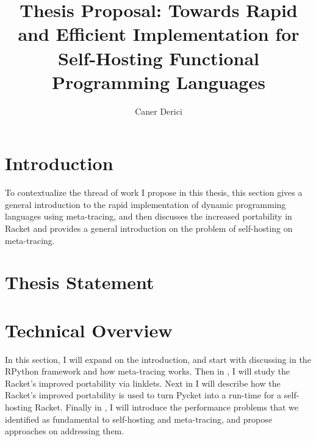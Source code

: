 \documentclass[9pt]{extarticle}
\title{Thesis Proposal: Towards Rapid and Efficient Implementation
  for Self-Hosting Functional Programming Languages}
\author{Caner Derici}
\begin{document}


\maketitle

\begin{abstract}
\end{abstract}

\tableofcontents

\newpage

\section{Introduction}
\label{sec:intro}

To contextualize the thread of work I propose in this thesis, this
section gives a general introduction to the rapid implementation of
dynamic programming languages using meta-tracing, and then discusses
the increased portability in Racket and provides a general
introduction on the problem of self-hosting on meta-tracing.


\section{Thesis Statement}
\label{sec:thesis}


\section{Technical Overview}
\label{sec:technical}

In this section, I will expand on the introduction, and start with
discussing in  the RPython framework and how
meta-tracing works. Then in , I will study the
Racket's improved portability via linklets. Next in
 I will describe how the Racket's improved
portability is used to turn Pycket into a run-time for a self-hosting
Racket. Finally in , I will introduce the
performance problems that we identified as fundamental to self-hosting
and meta-tracing, and propose approaches on addressing them.



\printbibliography
\end{document}
